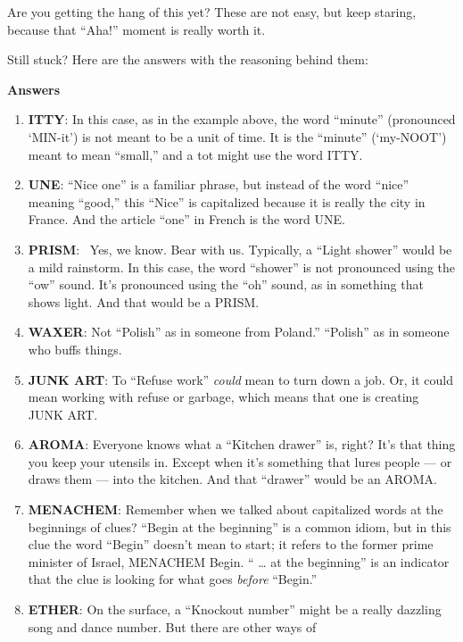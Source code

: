 Are you getting the hang of this yet? These are not easy, but keep
staring, because that ``Aha!'' moment is really worth it.~

Still stuck? Here are the answers with the reasoning behind them:

\textbf{Answers}~

\begin{enumerate}
\def\labelenumi{\arabic{enumi}.}
\tightlist
\item
  \textbf{ITTY}: In this case, as in the example above, the word
  ``minute'' (pronounced `MIN-it') is not meant to be a unit of time. It
  is the ``minute'' (`my-NOOT') meant to mean ``small,'' and a tot might
  use the word ITTY.
\item
  \textbf{UNE}: ``Nice one'' is a familiar phrase, but instead of the
  word ``nice'' meaning ``good,'' this ``Nice'' is capitalized because
  it is really the city in France. And the article ``one'' in French is
  the word UNE.
\item
  \textbf{PRISM}: ~Yes, we know. Bear with us. Typically, a ``Light
  shower'' would be a mild rainstorm. In this case, the word ``shower''
  is not pronounced using the ``ow'' sound. It's pronounced using the
  ``oh'' sound, as in something that shows light. And that would be a
  PRISM.
\item
  \textbf{WAXER}: Not ``Polish'' as in someone from Poland.'' ``Polish''
  as in someone who buffs things.
\item
  \textbf{JUNK ART}: To ``Refuse work'' \emph{could} mean to turn down a
  job. Or, it could mean working with refuse or garbage, which means
  that one is creating JUNK ART.
\item
  \textbf{AROMA}: Everyone knows what a ``Kitchen drawer'' is, right?
  It's that thing you keep your utensils in. Except when it's something
  that lures people --- or draws them --- into the kitchen. And that
  ``drawer'' would be an AROMA.
\item
  \textbf{MENACHEM}: Remember when we talked about capitalized words at
  the beginnings of clues? ``Begin at the beginning'' is a common idiom,
  but in this clue the word ``Begin'' doesn't mean to start; it refers
  to the former prime minister of Israel, MENACHEM Begin. `` \ldots{} at
  the beginning'' is an indicator that the clue is looking for what goes
  \emph{before} ``Begin.''
\item
  \textbf{ETHER}: On the surface, a ``Knockout number'' might be a
  really dazzling song and dance number. But there are other ways of

\end{enumerate}
